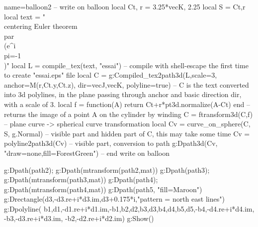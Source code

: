 \documentclass[border=5pt]{standalone}
\begin{document}
\begin{luadraw}{name=balloon2}
-- write on balloon
local Ct, r = 3.25*vecK, 2.25
local S = {Ct,r}
local text = "\\centering Euler theorem \\par \\(e^{i\\pi}=-1\\)"
local L = compile_tex(text, "essai") -- compile with shell-escape the first time to create "essai.eps" file
local C = g:Compiled_tex2path3d(L,{scale=3, anchor=M(r,Ct.y,Ct.z), dir={vecJ,vecK}, polyline=true})
-- C is the text converted into 3d polylines, in the plane passing through anchor and basic direction dir, with a scale of 3.
local f = function(A) return Ct+r*pt3d.normalize(A-Ct) end -- returns the image of a point A on the cylinder by winding
C = ftransform3d(C,f) -- plane curve -> spherical curve transformation
local Cv = curve_on_sphere(C, S, g.Normal) -- visible part and hidden part of C, this may take some time
Cv = polyline2path3d(Cv) -- visible part, conversion to path
g:Dpath3d(Cv, "draw=none,fill=ForestGreen")
-- end write on balloon

g:Dpath(path2); g:Dpath(mtransform(path2,mat))
g:Dpath(path3); g:Dpath(mtransform(path3,mat))
g:Dpath(path4); g:Dpath(mtransform(path4,mat))
g:Dpath(path5, "fill=Maroon")
g:Drectangle(d3,-d3.re+i*d3.im,d3+0.175*i,"pattern = north east lines")
g:Dpolyline( {{b1,d1,-d1.re+i*d1.im,-b1},{b2,d2},{b3,d3},{b4,d4},{b5,d5},{-b4,-d4.re+i*d4.im}, {-b3,-d3.re+i*d3.im}, {-b2,-d2.re+i*d2.im}})
g:Show()
\end{luadraw}
\end{document}
